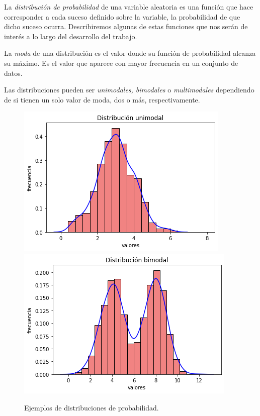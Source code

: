 \documentclass[oneside,openright,titlepage,numbers=noenddot,openany,headinclude,footinclude=true,
cleardoublepage=empty,abstractoff,BCOR=5mm,paper=a4,fontsize=12pt,main=spanish]{scrreprt}
\begin{document}
La \textit{distribución de probabilidad} de una variable aleatoria es una función que hace corresponder a cada suceso definido sobre la variable, la probabilidad de que dicho suceso ocurra. Describiremos algunas de estas funciones que nos serán de interés a lo largo del desarrollo del trabajo.\\

\begin{definition}[Moda]
La \textit{moda} de una distribución es el valor donde su función de probabilidad alcanza su máximo. Es el valor que aparece con mayor frecuencia en un conjunto de datos.
\end{definition}

\clearpage

Las distribuciones pueden ser \textit{unimodales, bimodales} o \textit{multimodales} dependiendo de si tienen un solo valor de moda, dos o más, respectivamente.\\

\begin{figure}[h]
      \includegraphics[width=\linewidth]{images/unimodal.png}
    \endminipage\hfill
      \includegraphics[width=\linewidth]{images/bimodal.png}
    \endminipage
     \caption{Ejemplos de distribuciones de probabilidad.}
\end{figure}
\end{document}
